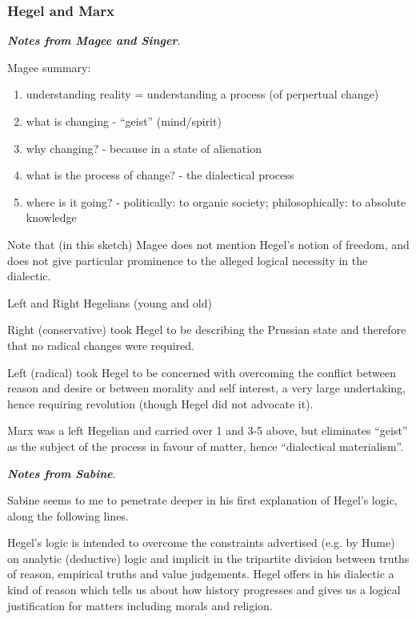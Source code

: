 \documentclass[10pt,titlepage]{book}
\begin{document}
\subsubsection{Hegel and Marx}

{\bf\emph{Notes from Magee and Singer}}.\label{Sin-Heg}

Magee\cite{magee-singer} summary:

\begin{enumerate}
\item understanding reality = understanding a process (of perpertual change)
\item what is changing - ``geist'' (mind/spirit)
\item why changing? - because in a state of alienation
\item what is the process of change? - the dialectical process
\item where is it going? - politically: to organic society; philosophically: to absolute knowledge
\end{enumerate}

Note that (in this sketch) Magee does not mention Hegel's notion of freedom, and does not give particular prominence to the alleged logical necessity in the dialectic. 

Left and Right Hegelians (young and old)

Right (conservative) took Hegel to be describing the Prussian state and therefore that no radical changes were required.

Left (radical) took Hegel to be concerned with overcoming the conflict between reason and desire or between morality and self interest, a very large undertaking, hence requiring revolution (though Hegel did not advocate it).

Marx was a left Hegelian and carried over 1 and 3-5 above, but eliminates ``geist'' as the subject of the process in favour of matter, hence ``dialectical materialism''.

{\bf\emph{Notes from Sabine}}.\label{Sab-Heg}

Sabine \cite{sabine63} seems to me to penetrate deeper in his first explanation of Hegel's logic, along the following lines.

Hegel's logic is intended to overcome the constraints advertised (e.g. by Hume) on analytic (deductive) logic and implicit in the tripartite division between truths of reason, empirical truths and value judgements.
Hegel offers in his dialectic a kind of reason which tells us about how history progresses and gives us a logical justification for matters including morals and religion.
\end{document}
